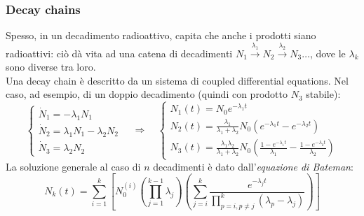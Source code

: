\subsubsection{Decay chains}

Spesso, in un decadimento radioattivo, capita che anche i prodotti siano radioattivi: ciò dà vita ad una catena di decadimenti $ N_1 \xrightarrow{\lambda_1} N_2 \xrightarrow{\lambda_2} N_3 \dots $, dove le $ \lambda_k $ sono diverse tra loro.\\
Una decay chain è descritto da un sistema di coupled differential equations. Nel caso, ad esempio, di un doppio decadimento (quindi con prodotto $ N_3 $ stabile):
\begin{equation}
	\begin{cases}
		\dot{N}_1 = - \lambda_1 N_1 \\
		\dot{N}_2 = \lambda_1 N_1 - \lambda_2 N_2 \\
		\dot{N}_3 = \lambda_2 N_2
	\end{cases}
	\quad\Longrightarrow\quad
	\begin{cases}
		N_1(t) = N_0 e^{-\lambda_1 t} \\
		N_2(t) = \frac{\lambda_1}{\lambda_1 + \lambda_2} N_0 \left( e^{-\lambda_1 t} - e^{-\lambda_2 t} \right) \\
		N_3(t) = \frac{\lambda_1 \lambda_2}{\lambda_1 + \lambda_2} N_0 \left( \frac{1 - e^{-\lambda_1 t}}{\lambda_1} - \frac{1 - e^{-\lambda_2 t}}{\lambda_2} \right)
	\end{cases}
	\label{eq:2.5}
\end{equation}
La soluzione generale al caso di $ n $ decadimenti è dato dall'\textit{equazione di Bateman}:
\begin{equation}
	N_k(t) = \sum_{i = 1}^{k} \left[ N_0^{(i)} \left( \prod_{j = 1}^{k-1} \lambda_j \right) \left( \sum_{j = i}^{k} \frac{e^{-\lambda_j t}}{\prod_{p=i, p\neq j}^{k} (\lambda_p - \lambda_j)} \right) \right]
	\label{eq:2.6}
\end{equation}

